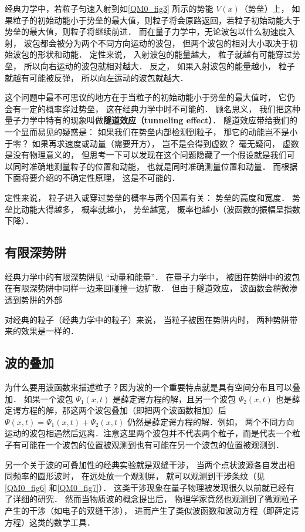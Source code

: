 经典力学中，若粒子匀速入射到如\autoref{QM0_fig3} 所示的势能 $V(x)$（势垒）上， 如果粒子的初始动能小于势垒的最大值，则粒子将会原路返回，若粒子初始动能大于势垒的最大值，则粒子将继续前进． 而在量子力学中，无论波包以什么初速度入射， 波包都会被分为两个不同方向运动的波包， 但两个波包的相对大小取决于初始波包的形状和动能． 定性来说， 入射波包的能量越大， 粒子就越有可能穿过势垒， 所以向右运动的波包就相对越大． 反之， 如果入射波包的能量越小， 粒子就越有可能被反弹， 所以向左运动的波包就越大．

这个问题中最不可思议的地方在于当粒子的初始动能小于势垒的最大值时， 它仍会有一定的概率穿过势垒， 这在经典力学中时不可能的． 顾名思义， 我们把这种量子力学中特有的现象叫做\textbf{隧道效应（tunneling effect）}． 隧道效应带给我们的一个显而易见的疑惑是： 如果我们在势垒内部检测到粒子， 那它的动能岂不是小于零？ 如果再求速度或动量（需要开方）， 岂不是会得到虚数？ 毫无疑问， 虚数是没有物理意义的， 但思考一下可以发现在这个问题隐藏了一个假设就是我们可以同时准确地测量粒子的位置和动能， 也就是同时准确测量位置和动量． 而根据下面将要介绍的不确定性原理， 这是不可能的．

定性来说， 粒子进入或穿过势垒的概率与两个因素有关： 势垒的高度和宽度． 势垒比动能大得越多， 概率就越小， 势垒越宽， 概率也越小（波函数的振幅呈指数下降）．

\subsection{有限深势阱}
经典力学中的有限深势阱见 “动量和能量”． 在量子力学中， 被困在势阱中的波包在有限深势阱中同样一边来回碰撞一边扩散． 但由于隧道效应， 波函数会稍微渗透到势阱的外部

对经典的粒子（经典力学中的粒子）来说， 当粒子被困在势阱内时， 两种势阱带来的效果是一样的．


\subsection{波的叠加}
为什么要用波函数来描述粒子？因为波的一个重要特点就是具有空间分布且可以叠加． 如果一个波包 $\Psi_1(x, t)$ 是薛定谔方程的解，且另一个波包 $\Psi_2(x, t)$ 也是薛定谔方程的解，那这两个波包叠加（即把两个波函数相加）后 $\Psi(x, t) = \Psi_1(x, t) + \Psi_2(x, t)$ 仍然是薛定谔方程的解．例如， 两个不同方向运动的波包相遇然后远离．注意这里两个波包并不代表两个粒子，而是代表一个粒子有可能在一个波包的位置被观测到也有可能在另一个波包的位置被观测到．

另一个关于波的可叠加性的经典实验就是双缝干涉， 当两个点状波源各自发出相同频率的圆形波时， 在远处放一个观测屏， 就可以观测到干涉条纹（见\autoref{QM0_fig6} 和\autoref{QM0_fig7}）． 这类干涉现象在量子物理被发现很久以前就已经有了详细的研究． 然而当物质波的概念提出后， 物理学家竟然也观测到了微观粒子产生的干涉（如电子的双缝干涉）， 进而产生了类似波函数和波动方程（即薛定谔方程）这类的数学工具．

